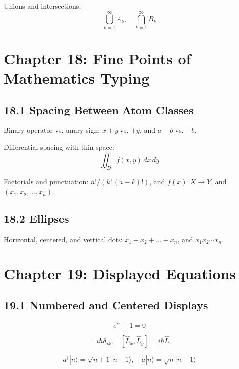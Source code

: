\documentclass{article}
\begin{document}
Unions and intersections:
\begin{equation}
\bigcup_{k=1}^\infty A_k, \quad \bigcap_{k=1}^\infty B_k
\end{equation}

\section*{Chapter 18: Fine Points of Mathematics Typing}

\subsection*{18.1 Spacing Between Atom Classes}
Binary operator vs. unary sign:
$x + y$ vs. $+y$, and $a - b$ vs. $-b$.

Differential spacing with thin space:
\begin{equation}
\iint_D f(x, y) \, dx \, dy
\end{equation}

Factorials and punctuation:
$n! / (k! \, (n-k)!)$, and $f(x) : X \to Y$, and $(x_1, x_2, \dots, x_n)$.

\subsection*{18.2 Ellipses}
Horizontal, centered, and vertical dots:
$x_1 + x_2 + \dots + x_n$, and $x_1 x_2 \cdots x_n$.

\section*{Chapter 19: Displayed Equations}

\subsection*{19.1 Numbered and Centered Displays}
\begin{equation}
e^{i\pi} + 1 = 0
\end{equation}

\begin{equation}
[\hat{x}_j, \hat{p}_k] = i\hbar\delta_{jk}, \quad [\hat{L}_x, \hat{L}_y] = i\hbar\hat{L}_z
\end{equation}

\begin{equation}
a^\dagger |n\rangle = \sqrt{n+1} |n+1\rangle, \quad a |n\rangle = \sqrt{n} |n-1\rangle
\end{equation}
\end{document}
